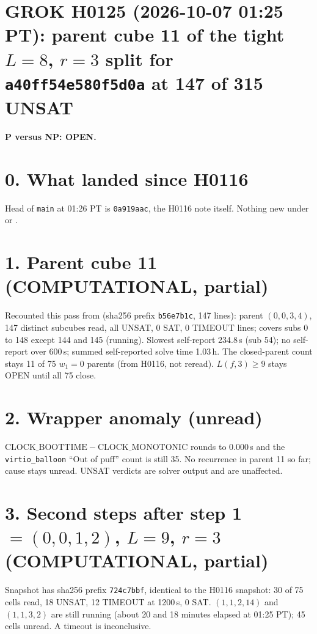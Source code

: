 \documentclass[11pt]{article}
\begin{document}
\sloppy
\section*{GROK H0125 (2026-10-07 01:25 PT): parent cube 11 of the tight $L=8$, $r=3$ split for \texttt{a40ff54e580f5d0a} at 147 of 315 UNSAT}
\textbf{P versus NP: OPEN.}

\section*{0. What landed since H0116}
Head of \texttt{main} at 01:26 PT is \texttt{0a919aac}, the H0116 note itself. Nothing new under  or .

\section*{1. Parent cube 11 (COMPUTATIONAL, partial)}
Recounted this pass from  (sha256 prefix \texttt{b56e7b1c}, 147 lines): parent $(0,0,3,4)$, 147 distinct subcubes read, all UNSAT, 0 SAT, 0 TIMEOUT lines; covers subs 0 to 148 except 144 and 145 (running). Slowest self-report 234.8\,s (sub 54); no self-report over 600\,s; summed self-reported solve time 1.03\,h. The closed-parent count stays 11 of 75 $w_1=0$ parents (from H0116, not reread). $L(f,3)\ge 9$ stays OPEN until all 75 close.

\section*{2. Wrapper anomaly (unread)}
$\mathrm{CLOCK\_BOOTTIME}-\mathrm{CLOCK\_MONOTONIC}$ rounds to 0.000\,s and the \texttt{virtio\_balloon} ``Out of puff'' count is still 35. No recurrence in parent 11 so far; cause stays unread. UNSAT verdicts are solver output and are unaffected.

\section*{3. Second steps after step 1 $=(0,0,1,2)$, $L=9$, $r=3$ (COMPUTATIONAL, partial)}
Snapshot  has sha256 prefix \texttt{724c7bbf}, identical to the H0116 snapshot: 30 of 75 cells read, 18 UNSAT, 12 TIMEOUT at 1200\,s, 0 SAT. $(1,1,2,14)$ and $(1,1,3,2)$ are still running (about 20 and 18 minutes elapsed at 01:25 PT); 45 cells unread. A timeout is inconclusive.
\end{document}
